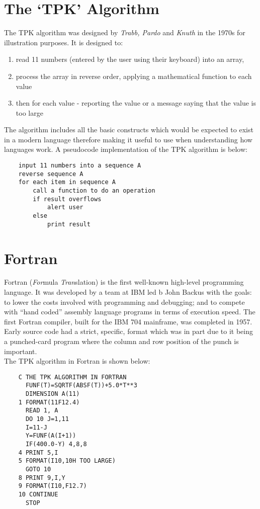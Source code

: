 
\section{The `TPK' Algorithm}
The TPK algorithm was designed by \textit{Trabb, Pardo} and \textit{Knuth} in the 1970s for illustration purposes. It is designed to:
\begin{enumerate}
    \item read 11 numbers (entered by the user using their keyboard) into an array,
    \item process the array in reverse order, applying a mathematical function to each value
    \item then for each value - reporting the value or a message saying that the value is too large
\end{enumerate}
The algorithm includes all the basic constructs which would be expected to exist in a modern language therefore making it useful to use when understanding how languages work. A pseudocode implementation of the TPK algorithm is below:
\begin{verbatim}
    input 11 numbers into a sequence A
    reverse sequence A
    for each item in sequence A
        call a function to do an operation
        if result overflows
            alert user
        else
            print result
\end{verbatim}

\section{Fortran}
Fortran (\textit{For}mula \textit{Tran}slation) is the first well-known high-level programming language. It was developed by a team at IBM led b John Backus with the goals: to lower the costs involved with programming and debugging; and to compete with ``hand coded'' assembly language programs in terms of execution speed. The first Fortran compiler, built for the IBM 704 mainframe, was completed in 1957. \\

Early source code had a strict, specific, format which was in part due to it being a punched-card program where the column and row position of the punch is important.\\

The TPK algorithm in Fortran is shown below:
\begin{verbatim}
    C THE TPK ALGORITHM IN FORTRAN
      FUNF(T)=SQRTF(ABSF(T))+5.0*T**3
      DIMENSION A(11)
    1 FORMAT(11F12.4)
      READ 1, A
      DO 10 J=1,11
      I=11-J
      Y=FUNF(A(I+1))
      IF(400.0-Y) 4,8,8
    4 PRINT 5,I
    5 FORMAT(I10,10H TOO LARGE)
      GOTO 10
    8 PRINT 9,I,Y
    9 FORMAT(I10,F12.7)
    10 CONTINUE
      STOP
\end{verbatim}

